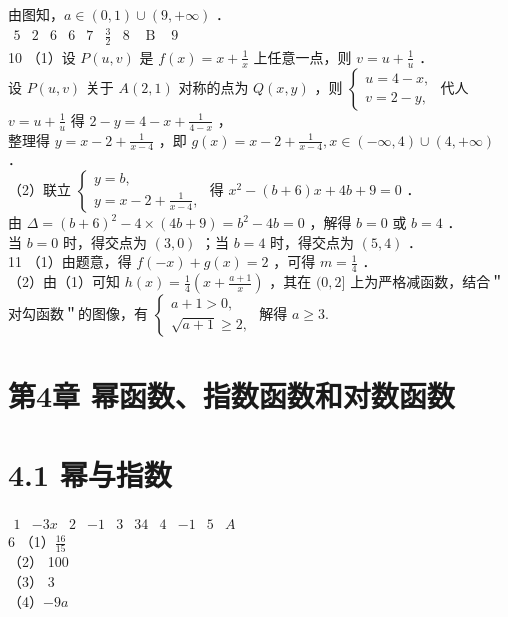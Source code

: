 \documentclass[10pt]{article}
\begin{document}
由图知，\(a \in(0,1) \cup(9,+\infty)\) ．\\
\(\begin{array}{lllllllll}5 & 2 & 6 & 6 & 7 & \frac{3}{2} & 8 & \text { B } & 9\end{array}\)\\
10 （1）设 \(P(u, v)\) 是 \(f(x)=x+\frac{1}{x}\) 上任意一点，则 \(v=u+\frac{1}{u}\) ．\\
设 \(P(u, v)\) 关于 \(A(2,1)\) 对称的点为 \(Q(x, y)\) ，则 \(\left\{\begin{array}{l}u=4-x, \\ v=2-y,\end{array}\right.\) 代人 \(v=u+\frac{1}{u}\) 得 \(2-y=4-x+\frac{1}{4-x}\) ，\\
整理得 \(y=x-2+\frac{1}{x-4}\) ，即 \(g(x)=x-2+\frac{1}{x-4}, x \in(-\infty, 4) \cup(4,+\infty)\) ．\\
（2）联立 \(\left\{\begin{array}{l}y=b, \\ y=x-2+\frac{1}{x-4},\end{array}\right.\) 得 \(x^{2}-(b+6) x+4 b+9=0\) ．\\
由 \(\Delta=(b+6)^{2}-4 \times(4 b+9)=b^{2}-4 b=0\) ，解得 \(b=0\) 或 \(b=4\) ．\\
当 \(b=0\) 时，得交点为 \((3,0)\) ；当 \(b=4\) 时，得交点为 \((5,4)\) ．\\
11 （1）由题意，得 \(f(-x)+g(x)=2\) ，可得 \(m=\frac{1}{4}\) ．\\
（2）由（1）可知 \(h(x)=\frac{1}{4}\left(x+\frac{a+1}{x}\right)\) ，其在 \((0,2]\) 上为严格减函数，结合＂对勾函数＂的图像，有 \(\left\{\begin{array}{l}a+1>0, \\ \sqrt{a+1} \geqslant 2,\end{array}\right.\) 解得 \(a \geqslant 3\).

\section*{第4章 幂函数、指数函数和对数函数}
\section*{4.1 幂与指数}
\(\begin{array}{llllllllll}1 & -3 x & 2 & -1 & 3 & 34 & 4 & -1 & 5 & A\end{array}\)\\
6 （1）\(\frac{16}{15}\)\\
（2） 100\\
（3） 3\\
（4）\(-9 a\)
\end{document}
